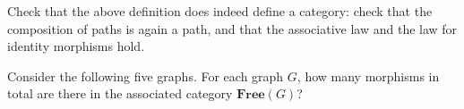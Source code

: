 \begin{exercise}
Check that the above definition does indeed define a category: check that the composition of paths is again a path, and that the associative law and the law for identity morphisms hold.
\end{exercise}

\begin{exercise}
Consider the following five graphs. For each graph $G$, how many morphisms in total are there in the associated category $\mathbf{Free}(G)$?

\

    \begin{center}
    \end{center}
\end{exercise}




